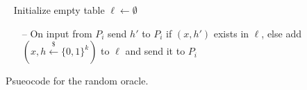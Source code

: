 \centering
\begin{bbox}[title={Functionality $\F_{\m{RO}}$}]
~
Initialize empty table $\ell \leftarrow \emptyset$
\begin{itemize}
\item[--] On input  from $P_i$ send $h'$ to $P_i$ if $(x,h')$ exists in $\ell$, else add $(x, h \xleftarrow{\$}\{0,1\}^k)$ to $\ell$ and send it to $P_i$
\end{itemize}
\end{bbox}
\caption{Psueocode for the random oracle.}
\label{fig:fro}
